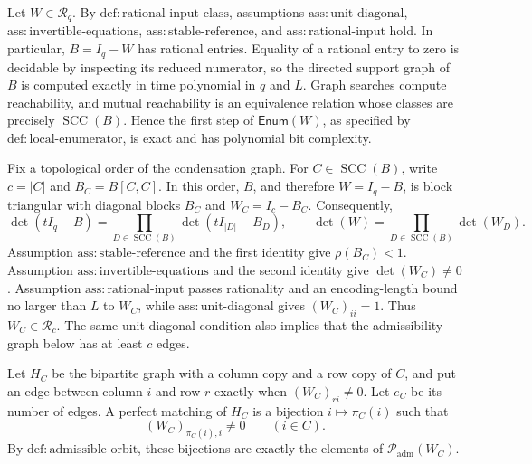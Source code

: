 Let \(W\in\mathcal R_q\).  By \(\mathrm{def:rational\mbox{-}input\mbox{-}class}\), assumptions \(\mathrm{ass:unit\mbox{-}diagonal}\), \(\mathrm{ass:invertible\mbox{-}equations}\), \(\mathrm{ass:stable\mbox{-}reference}\), and \(\mathrm{ass:rational\mbox{-}input}\) hold.  In particular, \(B=I_q-W\) has rational entries.  Equality of a rational entry to zero is decidable by inspecting its reduced numerator, so the directed support graph of \(B\) is computed exactly in time polynomial in \(q\) and \(L\).  Graph searches compute reachability, and mutual reachability is an equivalence relation whose classes are precisely \(\operatorname{SCC}(B)\).  Hence the first step of \(\mathsf{Enum}(W)\), as specified by \(\mathrm{def:local\mbox{-}enumerator}\), is exact and has polynomial bit complexity.

Fix a topological order of the condensation graph.  For \(C\in\operatorname{SCC}(B)\), write \(c=|C|\) and \(B_C=B[C,C]\).  In this order, \(B\), and therefore \(W=I_q-B\), is block triangular with diagonal blocks \(B_C\) and \(W_C=I_c-B_C\).  Consequently,
\[
 \det(tI_q-B)=\prod_{D\in\operatorname{SCC}(B)}
 \det(tI_{|D|}-B_D),
 \qquad
 \det(W)=\prod_{D\in\operatorname{SCC}(B)}\det(W_D).
\]
Assumption \(\mathrm{ass:stable\mbox{-}reference}\) and the first identity give \(\rho(B_C)<1\).  Assumption \(\mathrm{ass:invertible\mbox{-}equations}\) and the second identity give \(\det(W_C)\ne0\).  Assumption \(\mathrm{ass:rational\mbox{-}input}\) passes rationality and an encoding-length bound no larger than \(L\) to \(W_C\), while \(\mathrm{ass:unit\mbox{-}diagonal}\) gives \((W_C)_{ii}=1\).  Thus \(W_C\in\mathcal R_c\).  The same unit-diagonal condition also implies that the admissibility graph below has at least \(c\) edges.

Let \(H_C\) be the bipartite graph with a column copy and a row copy of \(C\), and put an edge between column \(i\) and row \(r\) exactly when \((W_C)_{ri}\ne0\).  Let \(e_C\) be its number of edges.  A perfect matching of \(H_C\) is a bijection \(i\mapsto\pi_C(i)\) such that
\[
 (W_C)_{\pi_C(i),i}\ne0\qquad(i\in C).
\]
By \(\mathrm{def:admissible\mbox{-}orbit}\), these bijections are exactly the elements of \(\mathcal P_{\mathrm{adm}}(W_C)\).

